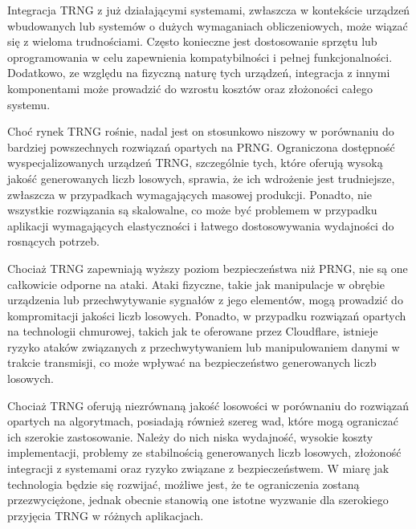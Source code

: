 Integracja TRNG z już działającymi systemami, zwłaszcza w kontekście urządzeń wbudowanych lub systemów o dużych wymaganiach obliczeniowych,
może wiązać się z wieloma trudnościami.
Często konieczne jest dostosowanie sprzętu lub oprogramowania w celu zapewnienia kompatybilności i pełnej funkcjonalności.
Dodatkowo, ze względu na fizyczną naturę tych urządzeń,
integracja z innymi komponentami może prowadzić do wzrostu kosztów oraz złożoności całego systemu.


Choć rynek TRNG rośnie, nadal jest on stosunkowo niszowy w porównaniu do bardziej powszechnych rozwiązań opartych na PRNG.
Ograniczona dostępność wyspecjalizowanych urządzeń TRNG, szczególnie tych, które oferują wysoką jakość generowanych liczb losowych,
sprawia, że ich wdrożenie jest trudniejsze, zwłaszcza w przypadkach wymagających masowej produkcji.
Ponadto, nie wszystkie rozwiązania są skalowalne, co może być problemem w przypadku aplikacji
wymagających elastyczności i łatwego dostosowywania wydajności do rosnących potrzeb.


Chociaż TRNG zapewniają wyższy poziom bezpieczeństwa niż PRNG, nie są one całkowicie odporne na ataki.
Ataki fizyczne, takie jak manipulacje w obrębie urządzenia lub przechwytywanie sygnałów z jego elementów,
mogą prowadzić do kompromitacji jakości liczb losowych.
Ponadto, w przypadku rozwiązań opartych na technologii chmurowej,
takich jak te oferowane przez Cloudflare, istnieje ryzyko ataków związanych z przechwytywaniem lub
manipulowaniem danymi w trakcie transmisji, co może wpływać na bezpieczeństwo generowanych liczb losowych.


Chociaż TRNG oferują niezrównaną jakość losowości w porównaniu do rozwiązań opartych na algorytmach,
posiadają również szereg wad, które mogą ograniczać ich szerokie zastosowanie.
Należy do nich niska wydajność, wysokie koszty implementacji, problemy ze stabilnością generowanych liczb losowych,
złożoność integracji z systemami oraz ryzyko związane z bezpieczeństwem. W miarę jak technologia będzie się rozwijać,
możliwe jest, że te ograniczenia zostaną przezwyciężone,
jednak obecnie stanowią one istotne wyzwanie dla szerokiego przyjęcia TRNG w różnych aplikacjach.